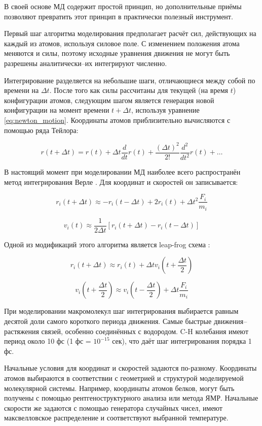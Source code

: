 В своей основе МД содержит простой принцип, но дополнительные приёмы позволяют превратить этот принцип в практически полезный инструмент.

Первый шаг алгоритма моделирования предполагает расчёт сил, действующих на каждый из атомов, используя силовое поле. С изменением положения атома меняются и силы, поэтому исходные уравнения движения не могут быть разрешены аналитически--их интегрируют численно.

Интегрирование разделяется на небольшие шаги, отличающиеся между собой по времени на $\Delta t$. После того как силы рассчитаны для текущей (на время $t$) конфигурации атомов, следующим шагом является генерация новой конфигурации на момент времени $t+\Delta t$, используя уравнение \eqref{eq:newton_motion}. Координаты атомов приблизительно вычисляются с помощью ряда Тейлора:

\[
r(t+\Delta t) = r(t) + \Delta t {\frac{d}{dt}} r(t) + { \frac{(\Delta t)^2}{2!} } {\frac{d^2}{dt^2}} r(t) + \ldots
\]

В настоящий момент при моделировании МД наиболее всего распространён метод интегрирования Верле \cite{Verlet1967}. Для координат и скоростей он записывается:

\[
r_i(t + \Delta t) \approx -r_i(t - \Delta t) + 2r_i(t) + \Delta t^2 {\frac{F_i}{m_i}}
\]

\[
v_i(t) \approx {\frac{1}{2 \Delta t}} [r_i(t + \Delta t) - r_i(t - \Delta t)]
\]

Одной из модификаций этого алгоритма является leap-frog схема \cite{Hockney1974}:

\[
r_i(t + \Delta t) \approx r_i(t) + \Delta t v_i(t + \frac{\Delta t}{2})
\]

\[
v_i(t + \frac{\Delta t}{2}) \approx v_i(t - \frac{\Delta t}{2}) + \Delta t \frac{F_i}{m_i}
\]

При моделировании макромолекул шаг интегрирования выбирается равным десятой доли самого короткого периода движения. Самые быстрые движения--растяжения связей, особенно соединённых с водородом. C-H колебания имеют период около 10 фс (1 фс = $10^{-15}$ сек), что даёт шаг интегрирования порядка 1 фс.

Начальные условия для координат и скоростей задаются по-разному. Координаты атомов выбираются в соответствии с геометрией и структурой моделируемой молекулярной системы. Например, координаты атомов белков, могут быть получены с помощью рентгеноструктурного анализа или метода ЯМР. Начальные скорости же задаются с помощью генератора случайных чисел, имеют максвелловское распределение и соответствуют выбранной температуре.

